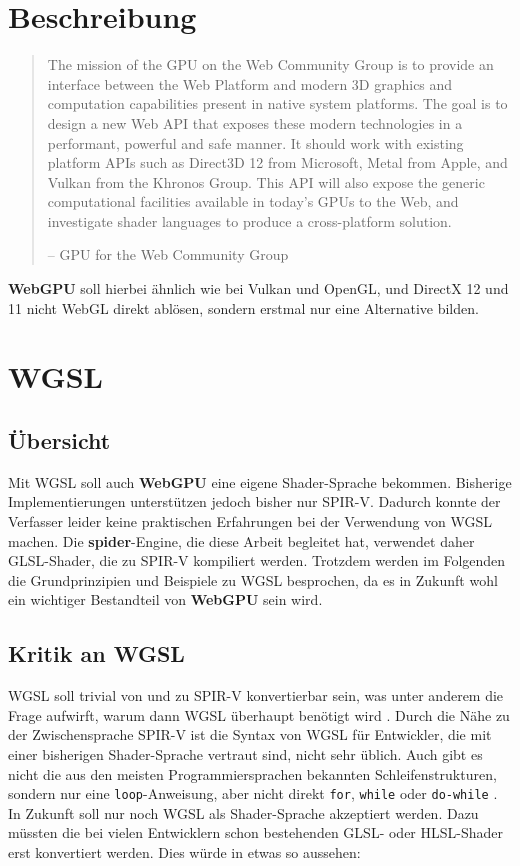 \documentclass[oneside]{ausarbeitung}
\newcommand*{\quotize}[1]{\glqq #1\grqq}
\begin{document}
\section{Beschreibung}
\begin{minipage} {\textwidth}
\begin{quote}
\quotize{The mission of the GPU on the Web Community Group is to provide an interface between the Web Platform and modern 3D graphics and computation capabilities present in native system platforms. The goal is to design a new Web API that exposes these modern technologies in a performant, powerful and safe manner. It should work with existing platform APIs such as Direct3D 12 from Microsoft, Metal from Apple, and Vulkan from the Khronos Group. This API will also expose the generic computational facilities available in today's GPUs to the Web, and investigate shader languages to produce a cross-platform solution.}

-- GPU for the Web Community Group \cite{w3:community_gpu}
\end{quote}
\end{minipage}

\textbf{WebGPU} soll hierbei ähnlich wie bei Vulkan und OpenGL, und DirectX 12 und 11 nicht WebGL direkt ablösen, sondern erstmal nur eine Alternative bilden.

\section{WGSL}
\subsection{Übersicht}
Mit WGSL \cite{w3:wgsl} soll auch \textbf{WebGPU} eine eigene Shader-Sprache bekommen. Bisherige Implementierungen unterstützen jedoch bisher nur SPIR-V. Dadurch konnte der Verfasser leider keine praktischen Erfahrungen bei der Verwendung von WGSL machen. Die \textbf{spider}-Engine, die diese Arbeit begleitet hat, verwendet daher GLSL-Shader, die zu SPIR-V kompiliert werden. Trotzdem werden im Folgenden die Grundprinzipien und Beispiele zu WGSL besprochen, da es in Zukunft wohl ein wichtiger Bestandteil von \textbf{WebGPU} sein wird.

\subsection{Kritik an WGSL}
WGSL soll \quotize{trivial von und zu SPIR-V konvertierbar} \cite[Vgl.][Goals]{w3:wgsl} sein, was unter anderem die Frage aufwirft, warum dann WGSL überhaupt benötigt wird \cite[Vgl.][]{github:wgsl_terrible}. Durch die Nähe zu der Zwischensprache SPIR-V ist die Syntax von WGSL für Entwickler, die mit einer bisherigen Shader-Sprache vertraut sind, nicht sehr üblich. Auch gibt es nicht die aus den meisten Programmiersprachen bekannten Schleifenstrukturen, sondern nur eine \texttt{loop}-Anweisung, aber nicht direkt \texttt{for}, \texttt{while} oder \texttt{do-while} \cite[Vgl.][]{github:wgsl_loop}. In Zukunft soll nur noch WGSL als Shader-Sprache akzeptiert werden. Dazu müssten die bei vielen Entwicklern schon bestehenden GLSL- oder HLSL-Shader erst konvertiert werden. Dies würde in etwas so aussehen:
\end{document}
